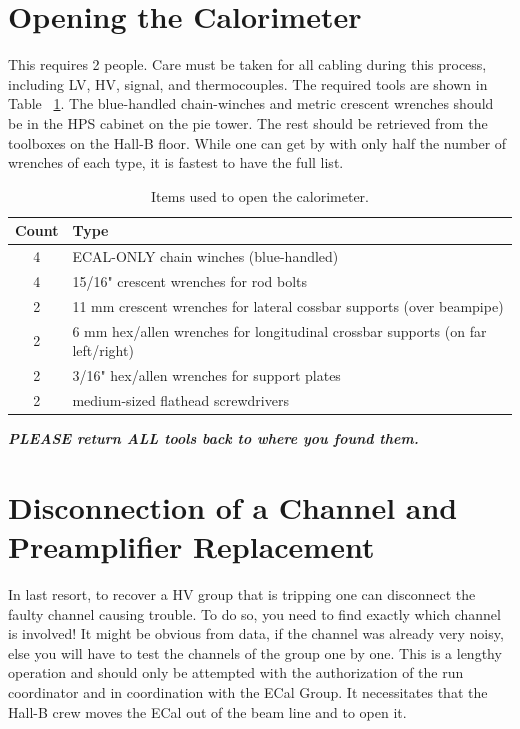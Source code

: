 \documentclass[12pt]{article}
\begin{document}
\iffalse

\section{Opening the Calorimeter}

This requires 2 people.  Care must be taken for all cabling during this process, including LV, HV, signal, and thermocouples.  The required tools are shown in Table ~\ref{tab:tools}.  The blue-handled chain-winches and metric crescent wrenches should be in the HPS cabinet on the pie tower.  The rest should be retrieved from the toolboxes on the Hall-B floor.  While one can get by with only half the number of wrenches of each type, it is fastest to have the full list. 

\begin{table}[htbp]\centering
    \begin{tabular}{c|l}\hline
        Count & Type \\\hline
4&   ECAL-ONLY chain winches (blue-handled)\\
4&   15/16" crescent wrenches for rod bolts\\
2&   11 mm crescent wrenches for lateral cossbar supports (over beampipe)\\
2&   6 mm hex/allen wrenches for longitudinal crossbar supports (on far left/right)\\
2&   3/16" hex/allen wrenches for support plates\\
2&   medium-sized flathead screwdrivers\\\hline
    \end{tabular}
    \caption{Items used to open the calorimeter. \label{tab:tools}}
\end{table}

{\bf\em PLEASE return ALL tools back to where you found them.}

   \section{Disconnection of a Channel and Preamplifier Replacement}
     
      In last resort, to recover a HV group that is tripping one can disconnect the faulty channel causing trouble. To do so, you need to find exactly which channel is involved! It might be obvious from data, if the channel was already very noisy, else you will have to test the channels of the group one by one. This is a lengthy operation and should only be attempted with the authorization of the run coordinator and in coordination with the ECal Group. It necessitates that the Hall-B crew moves the ECal out of the beam line and to open it.
\end{document}
